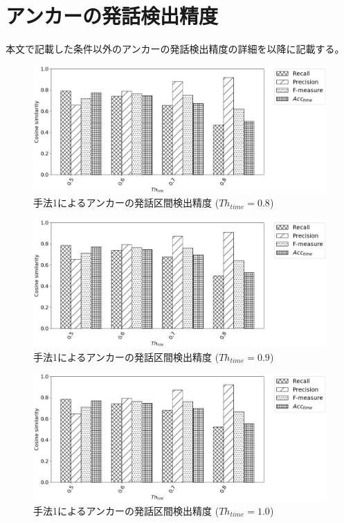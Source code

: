 \chapter{アンカーの発話検出精度}
本文で記載した条件以外のアンカーの発話検出精度の詳細を以降に記載する。
\label{other_result}

\begin{figure}[H]
  \begin{center}
    \includegraphics[scale=0.5]{./figure/prob1_08.eps}
  \end{center}
  \caption{手法1によるアンカーの発話区間検出精度 ($Th_{time}=0.8$)}
\end{figure}

\begin{figure}[H]
  \begin{center}
    \includegraphics[scale=0.5]{./figure/prob1_09.eps}
  \end{center}
  \caption{手法1によるアンカーの発話区間検出精度 ($Th_{time}=0.9$)}
\end{figure}

\begin{figure}[H]
  \begin{center}
    \includegraphics[scale=0.5]{./figure/prob1_10.eps}
  \end{center}
  \caption{手法1によるアンカーの発話区間検出精度 ($Th_{time}=1.0$)}
\end{figure}

